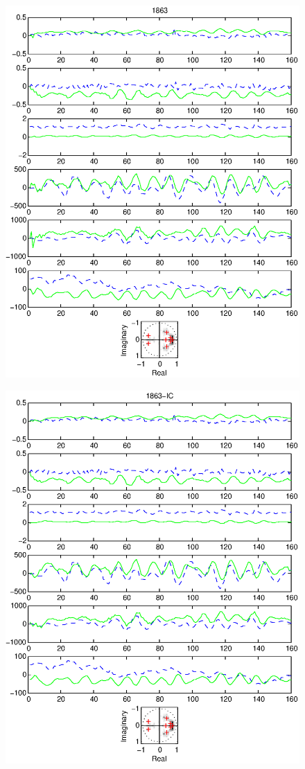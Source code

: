\documentclass{article}
\begin{document}
\begin{figure}[htb!]\centering
\includegraphics{1863.eps}
\end{figure}\clearpage
\begin{figure}[htb!]\centering
\includegraphics{1863_ic.eps}
\end{figure}\clearpage
\end{document}
